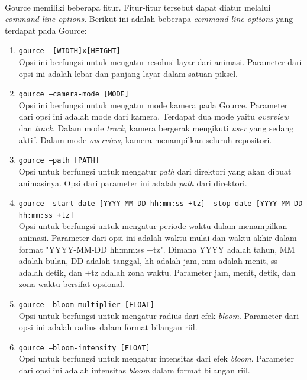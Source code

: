 \ \\
Gource memiliki beberapa fitur. Fitur-fitur tersebut dapat diatur melalui \textit{command line options}. Berikut ini adalah beberapa \textit{command line options} yang terdapat pada Gource:
\begin{enumerate}
\item \texttt{gource --[WIDTH]x[HEIGHT]}\\
Opsi ini berfungsi untuk mengatur resolusi layar dari animasi. Parameter dari opsi ini adalah lebar dan panjang layar dalam satuan piksel. 

\item \texttt{gource --camera-mode [MODE]}\\
Opsi ini berfungsi untuk mengatur mode kamera pada Gource. Parameter dari opsi ini adalah mode dari kamera. Terdapat dua mode yaitu \textit{overview} dan \textit{track}. Dalam mode \textit{track}, kamera bergerak mengikuti \textit{user} yang sedang aktif. Dalam mode \textit{overview}, kamera menampilkan seluruh repositori.

\item \texttt{gource --path [PATH]}\\
Opsi untuk berfungsi untuk mengatur \textit{path} dari direktori yang akan dibuat animasinya. Opsi dari parameter ini adalah \textit{path} dari direktori.

\item \texttt{gource --start-date [YYYY-MM-DD hh:mm:ss +tz] --stop-date [YYYY-MM-DD hh:mm:ss +tz]}\\
Opsi untuk berfungsi untuk mengatur periode waktu dalam menampilkan animasi. Parameter dari opsi ini adalah waktu mulai dan waktu akhir dalam format "YYYY-MM-DD hh:mm:ss +tz". Dimana YYYY adalah tahun, MM adalah bulan, DD adalah tanggal, hh adalah jam, mm adalah menit, ss adalah detik, dan +tz adalah zona waktu. Parameter jam, menit, detik, dan zona waktu bersifat opsional.    

\item \texttt{gource --bloom-multiplier [FLOAT] }\\
Opsi untuk berfungsi untuk mengatur radius dari efek \textit{bloom}. Parameter dari opsi ini adalah radius dalam format bilangan riil.

\item \texttt{gource --bloom-intensity [FLOAT]}\\
Opsi untuk berfungsi untuk mengatur intensitas dari efek \textit{bloom}. Parameter dari opsi ini adalah intensitas \textit{bloom} dalam format bilangan riil.


\end{enumerate}

